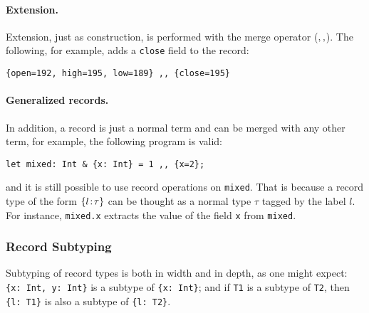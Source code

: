 \paragraph{Extension.}
Extension, just as construction, is performed with the merge operator
($ ,, $). The following, for example, adds a \lstinline{close}
field to the record:
\begin{lstlisting}
{open=192, high=195, low=189} ,, {close=195}
\end{lstlisting}

\paragraph{Generalized records.}
In addition, a record is just a normal term and can be merged with any other
term, for example, the following program is valid:
\begin{lstlisting}
let mixed: Int & {x: Int} = 1 ,, {x=2};
\end{lstlisting}
and it is still possible to use record operations on
\lstinline{mixed}. That is because a record type of the form $ \{ l \!:\! \tau \} $ can be thought as a normal type $ \tau $ tagged by the label
$ l $. For instance, \lstinline$mixed.x$ extracts the value of the field 
\lstinline{x} from \lstinline{mixed}.

\subsubsection{Record Subtyping}

Subtyping of record types is both in width and in depth, as one might
expect: \lstinline${x: Int, y: Int}$ is a subtype of
\lstinline${x: Int}$; and if \lstinline$T1$ is a subtype of
\lstinline$T2$, then \lstinline${l: T1}$ is also a subtype of
\lstinline${l: T2}$.



